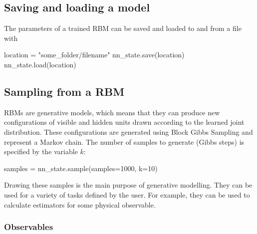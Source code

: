 \documentclass[submission, Phys]{SciPost}
\begin{document}
\subsection{Saving and loading a model}
The parameters of a trained RBM can be saved and loaded to and from a file with

\begin{python}
	location = "some_folder/filename"
	nn_state.save(location)
	nn_state.load(location)
\end{python}


\subsection{Sampling from a RBM}
\label{Sec:Sampling_a-Trained_RBM}

RBMs are generative models, which means that they can produce new configurations of visible and hidden units
drawn according to the learned joint distribution.
These configurations are generated using Block Gibbs Sampling and represent a Markov chain.
The number of samples to generate (Gibbs steps) is specified by the variable $k$:
\begin{python}
	samples = nn_state.sample(samples=1000, k=10)
\end{python}

Drawing these samples is the main purpose of generative modelling. 
They can be used for a variety of tasks defined by the user.
For example, they can be used to calculate estimators for some physical observable.

\subsubsection{Observables}
\label{Sec:Observables}
\end{document}
